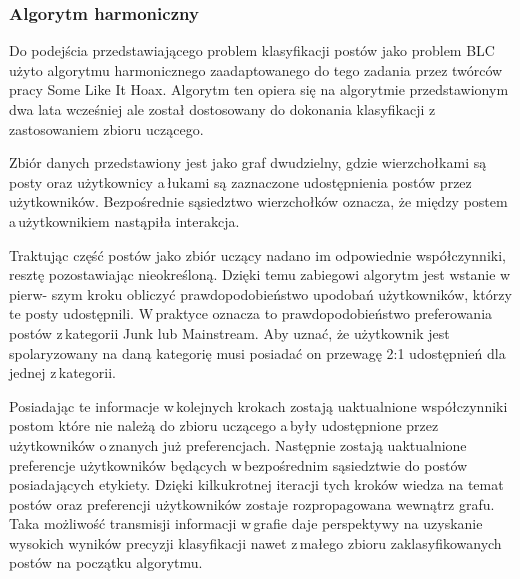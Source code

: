 \subsubsection{Algorytm harmoniczny}
Do podejścia przedstawiającego problem klasyfikacji postów jako problem BLC użyto algorytmu harmonicznego zaadaptowanego do tego zadania przez twórców pracy Some Like It Hoax. Algorytm ten opiera się na algorytmie przedstawionym dwa lata wcześniej\cite{de2015reliable} ale został dostosowany do dokonania klasyfikacji z\,zastosowaniem zbioru uczącego. 
\par
	Zbiór danych przedstawiony jest jako graf dwudzielny, gdzie wierzchołkami są posty oraz użytkownicy a\,łukami są zaznaczone udostępnienia postów przez użytkowników.  Bezpośrednie sąsiedztwo wierzchołków oznacza, że między postem a\,użytkownikiem nastąpiła interakcja.
\par
Traktując część postów jako zbiór uczący nadano im odpowiednie współczynniki, resztę pozostawiając nieokreśloną. Dzięki temu zabiegowi algorytm jest wstanie w\,pierw- szym kroku obliczyć prawdopodobieństwo upodobań użytkowników, którzy te posty udostępnili. W\,praktyce oznacza to prawdopodobieństwo preferowania postów z\,kategorii Junk lub Mainstream. Aby uznać, że użytkownik jest spolaryzowany na daną kategorię musi posiadać on przewagę 2:1 udostępnień dla jednej z\,kategorii. 
\par
	Posiadając te informacje w\,kolejnych krokach zostają uaktualnione współczynniki postom które nie należą do zbioru uczącego a\,były udostępnione przez użytkowników o\,znanych już preferencjach. Następnie zostają uaktualnione preferencje użytkowników będących w\,bezpośrednim sąsiedztwie do postów posiadających etykiety. Dzięki kilkukrotnej iteracji tych kroków wiedza na temat postów oraz preferencji użytkowników zostaje rozpropagowana wewnątrz grafu. Taka możliwość transmisji informacji w\,grafie daje perspektywy na uzyskanie wysokich wyników precyzji klasyfikacji nawet z\,małego zbioru zaklasyfikowanych postów na początku algorytmu.
